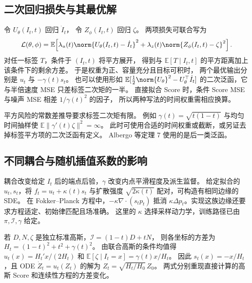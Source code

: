\subsection{二次回归损失与其最优解\requiredderivation}

令 \(U_\theta(I_t,t)\) 回归 \(\dot I_t\)，
令 \(Z_\phi(I_t,t)\) 回归 \(\zeta\)。
两项损失可联合写为
\begin{equation}
  \mathcal L(\theta,\phi)=\mathbb E\!\left[
       \lambda_u(t)\norm{U_\theta(I_t,t)-\dot I_t}^2+
       \lambda_z(t)\norm{Z_\phi(I_t,t)-\zeta}^2\right].
  \label{eq:training-si-loss}
\end{equation}
对任一标签 \(T\)，条件于 \((I_t,t)\) 将平方展开，
得到与 \(\mathbb E[T\mid I_t,t]\) 的平方距离加上该条件下的剩余方差。
于是权重为正、容量充分且目标可积时，
两个最优输出分别是 \(u_t\) 与 \(-\gamma(t)s_t\)。
也可以使用形如 \(\mathbb E[\tfrac12\norm{U_\theta}^2-U_\theta^\top\dot I_t]\)
的二次泛函，它与半倍速度 MSE 只差标签二次矩的一半。
直接拟合 Score 时，条件 Score MSE 与噪声 MSE 相差 \(1/\gamma(t)^2\) 的因子，
所以两种写法的时间权重需相应换算。

平方风险的常数差推导要求标签二次矩有限。
例如 \(\gamma(t)=\sqrt{t(1-t)}\) 与均匀时间抽样使
\(\mathbb E\lVert\gamma'(t)\zeta\rVert^2=\infty\)。
此时可使用合适的时间权重或截断，或另证去掉标签平方项的二次泛函有定义。
Albergo 等定理 7 使用的是后一类泛函。

\subsection{不同耦合与随机插值系数的影响}

耦合改变给定 \(I_t\) 后的端点后验，\(\gamma\) 改变内点平滑程度及派生监督。
给定拟合的 \(u_t,s_t\)，将 \(f_t=u_t+\kappa(t)s_t\)
与扩散强度 \(\sqrt{2\kappa(t)}\) 配对，可构造有相同边缘的 SDE。
在 Fokker--Planck 方程中，\(-\kappa\nabla\cdot(s_tp_t)\) 抵消
\(\kappa\Delta p_t\)。实现这族边缘还要求方程适定、初始律匹配且场准确。
这里的 \(\kappa\) 选择采样动力学，训练路径已由 \(\pi,\mathcal I,\gamma\) 给定。

\begin{example}
若 \(D,N,\zeta\) 是独立标准高斯，\(\mathcal I=(1-t)D+tN\)，
则各坐标的方差为 \(H_t=(1-t)^2+t^2+\gamma(t)^2\)。
由联合高斯的条件均值得
\(u_t(x)=H_t' x/(2H_t)\) 和
\(\mathbb E[\zeta\mid I_t=x]=\gamma(t)x/H_t\)。
因此 \(s_t(x)=-x/H_t\)，且 ODE \(\dot Z_t=u_t(Z_t)\) 的解为
\(Z_t=\sqrt{H_t/H_0}\,Z_0\)。
两式分别重现直接计算的高斯 Score 和连续性方程的方差变化。
\end{example}

